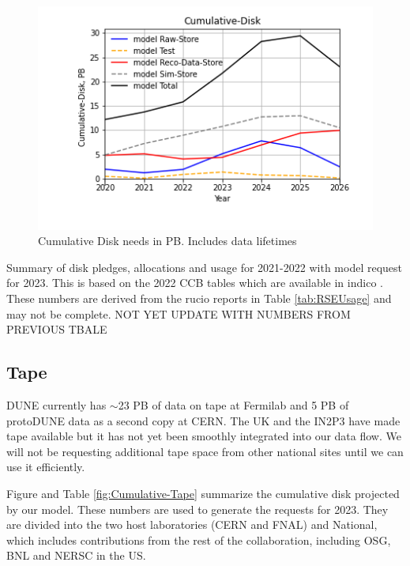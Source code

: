 \documentclass[12pt]{article}
\begin{document}
\begin{figure}[h]
\centering\includegraphics[height=0.5\textwidth]{Parameters_2022-11-21-2026/Parameters_2022-11-21-2026-Cumulative-Disk.png}

\caption{Cumulative Disk needs in PB. Includes data lifetimes}\label{fig:Cumulative-Disk}
\end{figure}




\begin{table}[ht]
\centering{}
\caption{Summary of disk pledges, allocations and usage for 2021-2022 with model request for 2023.  This is based on the 2022 CCB tables which are available in indico  \cite{CCB2022,CCB2023}.  These numbers are derived from the rucio reports in Table \ref{tab:RSEUsage} and may not be complete. NOT YET UPDATE WITH NUMBERS FROM PREVIOUS TBALE }
\label{tab:DiskPledges}
\end{table}

\clearpage
\subsection{Tape}

DUNE currently has $\sim$23 PB of data on tape at Fermilab and 5 PB of protoDUNE data as a second copy at CERN.  The UK and the IN2P3 have made tape available but it has not yet been smoothly integrated into our data flow.  We will not be requesting additional tape space from other national sites until we can use it efficiently. 

Figure and Table  \ref{fig:Cumulative-Tape}  summarize the cumulative disk projected by our model. These numbers are used to generate the requests for 2023.  They are divided into the two host laboratories (CERN and FNAL) and National, which includes contributions from the rest of the collaboration, including OSG, BNL and NERSC in the US. 
\end{document}

